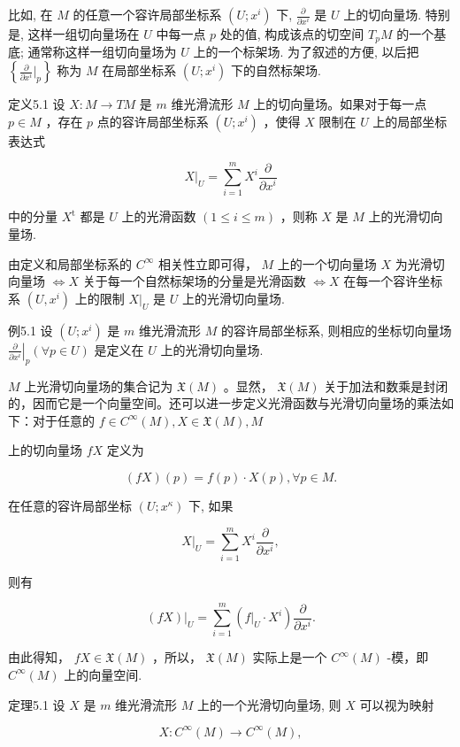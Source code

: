 比如, 在  $M$  的任意一个容许局部坐标系  $(U; x^i)$  下,  $\frac{\partial}{\partial x^i}$  是  $U$  上的切向量场. 特别是, 这样一组切向量场在  $U$  中每一点  $p$  处的值, 构成该点的切空间  $T_p M$  的一个基底; 通常称这样一组切向量场为  $U$  上的一个标架场. 为了叙述的方便, 以后把  $\left\{\frac{\partial}{\partial x^i}\bigg|_p\right\}$  称为  $M$  在局部坐标系  $(U; x^i)$  下的自然标架场.

定义5.1 设  $X: M \to TM$  是  $m$  维光滑流形  $M$  上的切向量场。如果对于每一点  $p \in M$ ，存在  $p$  点的容许局部坐标系  $(U; x^i)$ ，使得  $X$  限制在  $U$  上的局部坐标表达式

$$
X | _ {U} = \sum_ {i = 1} ^ {m} X ^ {i} \frac {\partial}{\partial x ^ {i}}
$$

中的分量  $X^{\mathrm{t}}$  都是  $U$  上的光滑函数  $(1\leqslant i\leqslant m)$  ，则称  $X$  是  $M$  上的光滑切向量场.

由定义和局部坐标系的  $C^\infty$  相关性立即可得， $M$  上的一个切向量场  $X$  为光滑切向量场  $\iff X$  关于每一个自然标架场的分量是光滑函数  $\iff X$  在每一个容许坐标系  $(U, x^i)$  上的限制  $X|_U$  是  $U$  上的光滑切向量场.

例5.1 设  $(U; x^i)$  是  $m$  维光滑流形  $M$  的容许局部坐标系, 则相应的坐标切向量场  $\left.\frac{\partial}{\partial x^i}\right|_p (\forall p \in U)$  是定义在  $U$  上的光滑切向量场.

$M$  上光滑切向量场的集合记为  $\mathfrak{X}(M)$ 。显然， $\mathfrak{X}(M)$  关于加法和数乘是封闭的，因而它是一个向量空间。还可以进一步定义光滑函数与光滑切向量场的乘法如下：对于任意的  $f \in C^{\infty}(M), X \in \mathfrak{X}(M), M$

上的切向量场  $fX$  定义为

$$
(f X) (p) = f (p) \cdot X (p), \forall p \in M.
$$

在任意的容许局部坐标  $(U; x^{\kappa})$  下, 如果

$$
X | _ {U} = \sum_ {i = 1} ^ {m} X ^ {i} \frac {\partial}{\partial x ^ {i}},
$$

则有

$$
(f X) | _ {U} = \sum_ {i = 1} ^ {m} (f | _ {U} \cdot X ^ {i}) \frac {\partial}{\partial x ^ {i}}.
$$

由此得知，  $fX\in \mathfrak{X}(M)$  ，所以，  $\mathfrak{X}(M)$  实际上是一个  $C^\infty (M)$  -模，即 $C^\infty (M)$  上的向量空间.

定理5.1 设  $X$  是  $m$  维光滑流形  $M$  上的一个光滑切向量场, 则  $X$  可以视为映射

$$
X: C ^ {\infty} (M) \to C ^ {\infty} (M),
$$


